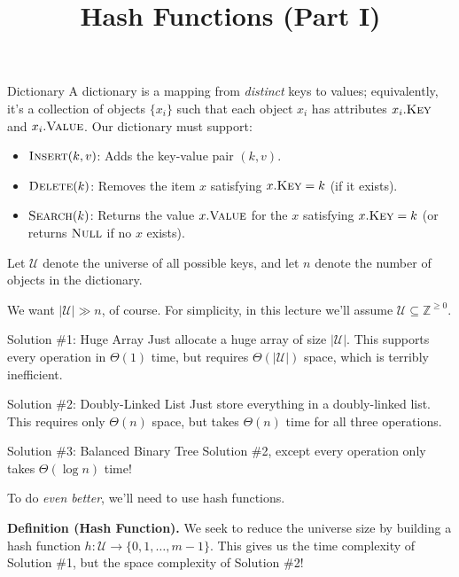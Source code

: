 \title{Hash Functions (Part I)}



\begin{problem}{Dictionary}
    A dictionary is a mapping from \emph{distinct} keys to values; equivalently, it's a collection of objects $\{x_i\}$ such that each object $x_i$ has attributes $x_i.\textsc{Key}$ and $x_i.\textsc{Value}$.  Our dictionary must support:
    \begin{itemize}
        \item $\textsc{Insert}(k, v)$: Adds the key-value pair $(k, v)$.
        \item $\textsc{Delete}(k)$: Removes the item $x$ satisfying $x.\textsc{Key} = k$ (if it exists).
        \item $\textsc{Search}(k)$: Returns the value $x.\textsc{Value}$ for the $x$ satisfying $x.\textsc{Key} = k$ (or returns $\textsc{Null}$ if no $x$ exists).
    \end{itemize}
\end{problem}
Let $\mathcal{U}$ denote the universe of all possible keys, and let $n$ denote the number of objects in the dictionary.

We want $|\mathcal{U}| \gg n$, of course.  For simplicity, in this lecture we'll assume $\mathcal{U} \subseteq \mathbb{Z}^{\geq 0}$.

\begin{solution}{Solution \#1: Huge Array}
    Just allocate a huge array of size $|\mathcal{U}|$.  This supports every operation in $\Theta(1)$ time, but requires $\Theta(|\mathcal{U}|)$ space, which is terribly inefficient.
\end{solution}

\begin{solution}{Solution \#2: Doubly-Linked List}
    Just store everything in a doubly-linked list.  This requires only $\Theta(n)$ space, but takes $\Theta(n)$ time for all three operations.
\end{solution}

\begin{solution}{Solution \#3: Balanced Binary Tree}
    Solution \#2, except every operation only takes $\Theta(\log n)$ time!
\end{solution}

To do \emph{even better}, we'll need to use hash functions.

\textbf{Definition (Hash Function).} We seek to reduce the universe size by building a hash function $h: \mathcal{U} \to \{0, 1, \dots, m - 1\}$.  This gives us the time complexity of Solution \#1, but the space complexity of Solution \#2!

